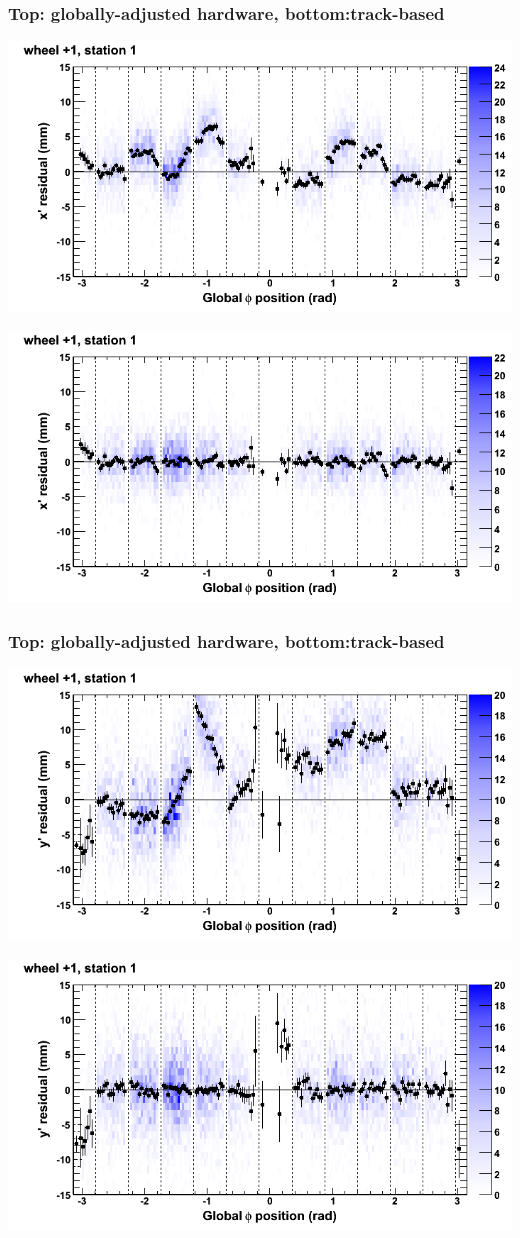 \documentclass[compress]{beamer}
\begin{document}
\begin{frame}
\frametitle{Top: globally-adjusted hardware, bottom:track-based}
\includegraphics[width=0.7\linewidth]{NOV4_mapplots_HW/DTvsphi_st1whD_x.png}

\includegraphics[width=0.7\linewidth]{NOV4_mapplots/DTvsphi_st1whD_x.png}
\end{frame}

\begin{frame}
\frametitle{Top: globally-adjusted hardware, bottom:track-based}
\includegraphics[width=0.7\linewidth]{NOV4_mapplots_HW/DTvsphi_st1whD_y.png}

\includegraphics[width=0.7\linewidth]{NOV4_mapplots/DTvsphi_st1whD_y.png}
\end{frame}
\end{document}
